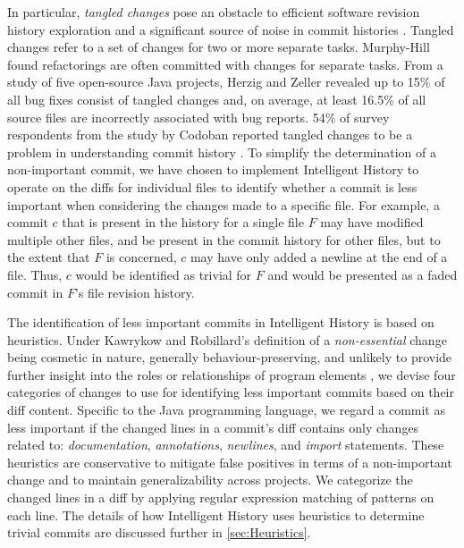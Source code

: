 In particular, \emph{tangled changes} pose an obstacle to efficient software revision history exploration 
and  a significant source of noise in commit histories \cite{herzig_tangled_2013}.
Tangled changes refer to a set of changes for two or more separate tasks. 
Murphy-Hill \etal \cite{murphy-hill_refactor_2012} found refactorings are often committed with  changes for separate tasks. 
From a study of five open-source Java projects, Herzig and Zeller \cite{herzig_tangled_2013} 
revealed  up to 15\% of all bug fixes consist of tangled changes and, 
on average, at least 16.5\% of all source files are incorrectly associated with bug reports. 
54\% of survey respondents from the study by Codoban \etal reported tangled changes to be a problem
in understanding commit history \cite{codoban_software_2015}.
To simplify the determination of a non-important commit, we have chosen to implement Intelligent History to operate on
the diffs for individual files to identify whether a commit is less important when considering the changes made to a specific file. 
For example, a commit $c$ that is present in the history for a single file $F$ may have modified multiple other files, 
and be present in the commit history for other files, but to the extent that $F$ is concerned, 
$c$ may have only added a newline at the end of a file.
Thus, $c$ would be identified as trivial for $F$ and would be presented as a faded commit in $F$'s file revision history.

The identification of less important commits in Intelligent History is based on heuristics.
Under Kawrykow and Robillard's definition of a \emph{non-essential} change being cosmetic in nature, 
generally behaviour-preserving, and unlikely to provide further insight into the roles or relationships of program elements \cite{kawrykow_non-essential_2011}, 
we devise four categories of changes to use for identifying less important commits based on their diff content.
Specific to the Java programming language, we regard a commit as less important if the changed lines in a commit's diff contains only changes related to: 
\emph{documentation}, \emph{annotations}, \emph{newlines}, and \emph{import} statements.
These heuristics are conservative to mitigate false positives in terms of a non-important change and to maintain generalizability across projects.
We categorize the changed lines in a diff by applying regular expression matching of patterns on each line.
The details of how Intelligent History uses heuristics to determine trivial commits are discussed further in \autoref{sec:Heuristics}.

